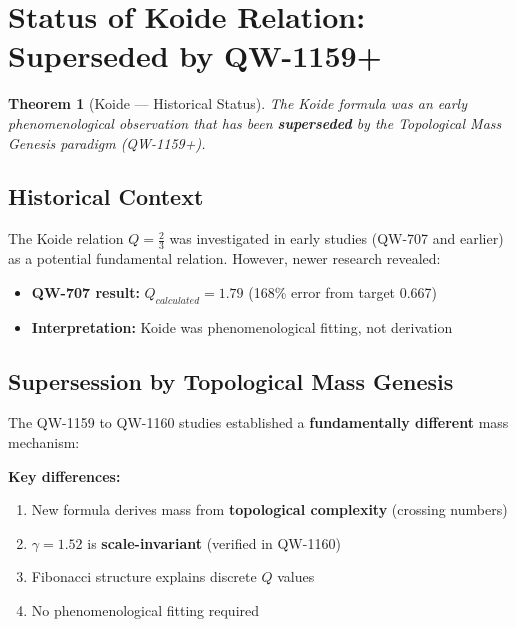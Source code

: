 \documentclass[11pt,a4paper]{book}
\newtheorem{theorem}{Theorem}[section]
\theoremstyle{remark}
\begin{document}
\section{Status of Koide Relation: Superseded by QW-1159+}

\begin{theorem}[Koide --- Historical Status]
The Koide formula was an early phenomenological observation that has been \textbf{superseded} by the Topological Mass Genesis paradigm (QW-1159+).
\end{theorem}

\subsection{Historical Context}

The Koide relation $Q = \frac{2}{3}$ was investigated in early studies (QW-707 and earlier) as a potential fundamental relation. However, newer research revealed:

\begin{itemize}
    \item \textbf{QW-707 result:} $Q_{calculated} = 1.79$ (168\% error from target 0.667)
    \item \textbf{Interpretation:} Koide was phenomenological fitting, not derivation
\end{itemize}

\subsection{Supersession by Topological Mass Genesis}

The QW-1159 to QW-1160 studies established a \textbf{fundamentally different} mass mechanism:

\begin{center}
\end{center}

\textbf{Key differences:}
\begin{enumerate}
    \item New formula derives mass from \textbf{topological complexity} (crossing numbers)
    \item $\gamma = 1.52$ is \textbf{scale-invariant} (verified in QW-1160)
    \item Fibonacci structure explains discrete $Q$ values
    \item No phenomenological fitting required
\end{enumerate}
\end{document}
